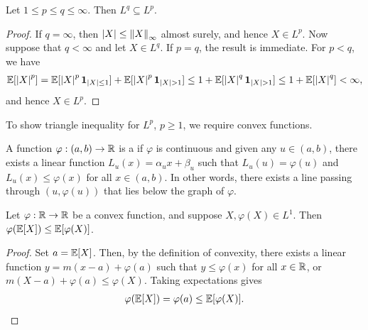 \begin{proposition}
    Let $1 \leq p \leq q \leq \infty$. Then $L^{q} \subseteq L^{p}$.
\end{proposition}
\begin{proof}
    If $q = \infty$, then $\left| X \right| \leq \left\lVert X\right\rVert_{\infty}$ almost surely,
    and hence $X \in L^{p}$. Now suppose that $q < \infty$ and let
    $X \in L^{q}$. If $p=q$, the result is immediate. For $p<q$, we have
    \begin{align}
        \mathbb{E}[\left| X \right|^{p}] = \mathbb{E}[\left| X \right|^{p}\textbf{1}_{\left| X \right| \leq 1}] + \mathbb{E}[\left| X \right|^{p}\textbf{1}_{\left| X \right| > 1}] \leq 1 + \mathbb{E}[\left| X \right|^{q}\textbf{1}_{\left| X \right| > 1}] \leq 1 + \mathbb{E}[\left| X \right|^{q}] < \infty,
    \end{align}
    and hence $X \in L^{p}$.
\end{proof}

To show triangle inequality for $L^{p}$, $p \geq 1$, we require convex functions.
\begin{definition}
    A function $\varphi:(a,b) \to \mathbb{R}$ is a  if $\varphi$ is continuous and given any $u \in (a,b)$, there exists a linear function $L_{u}(x) = \alpha_{u}x + \beta_{u}$ such that $L_{u}(u) = \varphi(u)$ and $L_{u}(x) \leq \varphi(x)$ for all $x \in (a,b)$. In other words, there exists a line passing through $(u,\varphi(u))$ that lies below the graph of $\varphi$.
\end{definition}

\begin{lemma}
    Let $\varphi:\mathbb{R} \to \mathbb{R}$ be a convex function, and suppose $X,\varphi(X) \in L^{1}$. Then $\varphi(\mathbb{E}[X]) \leq \mathbb{E}[\varphi(X)]$.
\end{lemma}
\begin{proof}
    Set $a = \mathbb{E}[X]$. Then, by the definition of convexity, there exists a linear function $y = m(x-a) + \varphi(a)$ such that $y \leq \varphi(x)$ for all $x \in \mathbb{R}$, or $m(X-a) + \varphi(a) \leq \varphi(X)$. Taking expectations gives 
    \begin{align}
        \varphi(\mathbb{E}[X]) = \varphi(a) \leq \mathbb{E}[\varphi(X)].
    \end{align}
\end{proof}

